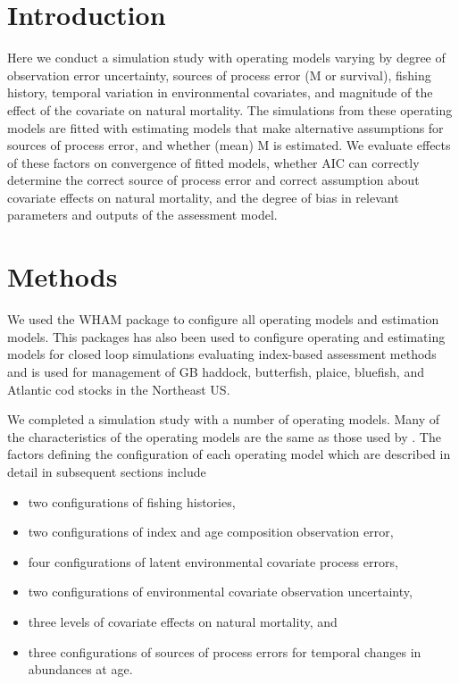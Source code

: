 \documentclass[
  12pt,
]{article}
\begin{document}
\pagebreak

\hypertarget{introduction}{%
\section*{Introduction}\label{introduction}}

Here we conduct a simulation study with operating models varying by
degree of observation error uncertainty, sources of process error (M or
survival), fishing history, temporal variation in environmental
covariates, and magnitude of the effect of the covariate on natural
mortality. The simulations from these operating models are fitted with
estimating models that make alternative assumptions for sources of
process error, and whether (mean) M is estimated. We evaluate effects of
these factors on convergence of fitted models, whether AIC can correctly
determine the correct source of process error and correct assumption
about covariate effects on natural mortality, and the degree of bias in
relevant parameters and outputs of the assessment model.

\hypertarget{methods}{%
\section*{Methods}\label{methods}}

We used the WHAM package
\citep[][version 1.0.7, commit 77bbd94]{millerstock20,stockmiller21} to
configure all operating models and estimation models. This packages has
also been used to configure operating and estimating models for closed
loop simulations evaluating index-based assessment methods
\citep{legaultetal23} and is used for management of GB haddock,
butterfish, plaice, bluefish, and Atlantic cod stocks in the Northeast
US.

We completed a simulation study with a number of operating models. Many
of the characteristics of the operating models are the same as those
used by \citet{milleretal_project0_wp}. The factors defining the
configuration of each operating model which are described in detail in
subsequent sections include

\begin{itemize}
\item two configurations of fishing histories, 
\item two configurations of index and age composition observation error, 
\item four configurations of latent environmental covariate process errors, 
\item two configurations of environmental covariate observation uncertainty, 
\item three levels of covariate effects on natural mortality, and 
\item three configurations of sources of process errors for temporal changes in abundances at age. 
\end{itemize}
\end{document}
